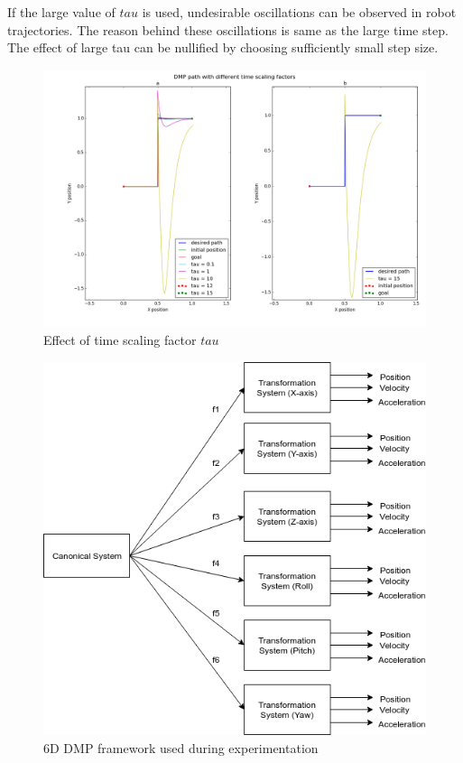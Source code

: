 If the large value of $tau$ is used, undesirable oscillations can be observed in robot trajectories. The reason behind these oscillations is same as the large time step. The effect of large tau can be nullified by choosing sufficiently small step size. 
\begin{figure}[H]
	\includegraphics[width=\textwidth]{images/tau_.png}
	\caption{Effect of time scaling factor $tau$}
	\label{fig:tau_}
\end{figure}

\begin{figure}[H]
	\includegraphics[width=\textwidth]{images/DMP_6DOF.png}
	\caption{6D DMP framework used during experimentation}
	\label{fig:DMP_6DOF}
\end{figure}

